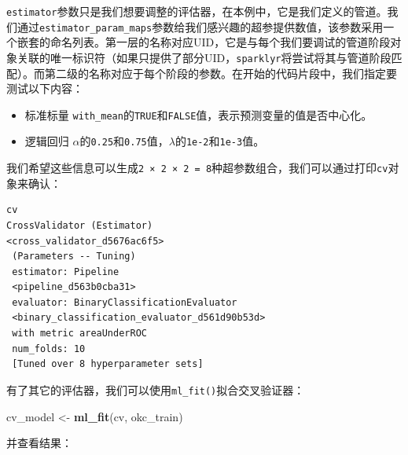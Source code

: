 \documentclass[
]{article}
\newenvironment{Shaded}{\begin{snugshade}}{\end{snugshade}}
\newcommand{\DecValTok}[1]{\textcolor[rgb]{0.00,0.00,0.81}{#1}}
\newcommand{\FloatTok}[1]{\textcolor[rgb]{0.00,0.00,0.81}{#1}}
\newcommand{\KeywordTok}[1]{\textcolor[rgb]{0.13,0.29,0.53}{\textbf{#1}}}
\newcommand{\NormalTok}[1]{#1}
\newcommand{\OperatorTok}[1]{\textcolor[rgb]{0.81,0.36,0.00}{\textbf{#1}}}
\newcommand{\OtherTok}[1]{\textcolor[rgb]{0.56,0.35,0.01}{#1}}
\newcommand{\StringTok}[1]{\textcolor[rgb]{0.31,0.60,0.02}{#1}}
\providecommand{\tightlist}{%
  \setlength{\itemsep}{0pt}\setlength{\parskip}{0pt}}
\begin{document}
\texttt{estimator}参数只是我们想要调整的评估器，在本例中，它是我们定义的管道。我们通过\texttt{estimator\_param\_maps}参数给我们感兴趣的超参提供数值，该参数采用一个嵌套的命名列表。第一层的名称对应UID，它是与每个我们要调试的管道阶段对象关联的唯一标识符（如果只提供了部分UID，\texttt{sparklyr}将尝试将其与管道阶段匹配）。而第二级的名称对应于每个阶段的参数。在开始的代码片段中，我们指定要测试以下内容：

\begin{itemize}
\tightlist
\item
  标准标量
  \texttt{with\_mean}的\texttt{TRUE}和\texttt{FALSE}值，表示预测变量的值是否中心化。
\item
  逻辑回归
  \(\alpha\)的\texttt{0.25}和\texttt{0.75}值，\(\lambda\)的\texttt{1e-2}和\texttt{1e-3}值。
\end{itemize}

我们希望这些信息可以生成\texttt{2\ ×\ 2\ ×\ 2\ =\ 8}种超参数组合，我们可以通过打印\texttt{cv}对象来确认：

\begin{verbatim}
cv
CrossValidator (Estimator)
<cross_validator_d5676ac6f5>
 (Parameters -- Tuning)
 estimator: Pipeline
 <pipeline_d563b0cba31>
 evaluator: BinaryClassificationEvaluator
 <binary_classification_evaluator_d561d90b53d>
 with metric areaUnderROC
 num_folds: 10
 [Tuned over 8 hyperparameter sets]
\end{verbatim}

有了其它的评估器，我们可以使用\texttt{ml\_fit()}拟合交叉验证器：

\begin{Shaded}
\begin{Highlighting}[]
\NormalTok{cv_model <-}\StringTok{ }\KeywordTok{ml_fit}\NormalTok{(cv, okc_train)}
\end{Highlighting}
\end{Shaded}

并查看结果：

\begin{Shaded}
\end{Shaded}
\end{document}
